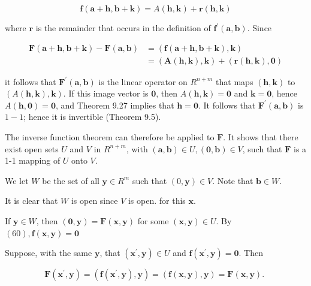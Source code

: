 \documentclass[10pt]{article}
\begin{document}
$$
\mathbf{f}(\mathbf{a}+\mathbf{h}, \mathbf{b}+\mathbf{k})=A(\mathbf{h}, \mathbf{k})+\mathbf{r}(\mathbf{h}, \mathbf{k})
$$

where $\mathbf{r}$ is the remainder that occurs in the definition of $\mathbf{f}^{\prime}(\mathbf{a}, \mathbf{b})$. Since

$$
\begin{aligned}
\mathbf{F}(\mathbf{a}+\mathbf{h}, \mathbf{b}+\mathbf{k})-\mathbf{F}(\mathbf{a}, \mathbf{b}) & =(\mathbf{f}(\mathbf{a}+\mathbf{h}, \mathbf{b}+\mathbf{k}), \mathbf{k}) \\
& =(\mathbf{A}(\mathbf{h}, \mathbf{k}), \mathbf{k})+(\mathbf{r}(\mathbf{h}, \mathbf{k}), \mathbf{0})
\end{aligned}
$$

it follows that $\mathbf{F}^{\prime}(\mathbf{a}, \mathbf{b})$ is the linear operator on $R^{n+m}$ that maps $(\mathbf{h}, \mathbf{k})$ to $(A(\mathbf{h}, \mathbf{k}), \mathbf{k})$. If this image vector is $\mathbf{0}$, then $A(\mathbf{h}, \mathbf{k})=\mathbf{0}$ and $\mathbf{k}=\mathbf{0}$, hence $A(\mathbf{h}, \mathbf{0})=\mathbf{0}$, and Theorem 9.27 implies that $\mathbf{h}=\mathbf{0}$. It follows that $\mathbf{F}^{\prime}(\mathbf{a}, \mathbf{b})$ is $1-1$; hence it is invertible (Theorem 9.5).

The inverse function theorem can therefore be applied to $\mathbf{F}$. It shows that there exist open sets $U$ and $V$ in $R^{n+m}$, with $(\mathbf{a}, \mathbf{b}) \in U,(\mathbf{0}, \mathbf{b}) \in V$, such that $\mathbf{F}$ is a 1-1 mapping of $U$ onto $V$.

We let $W$ be the set of all $\mathbf{y} \in R^{m}$ such that $(0, \mathbf{y}) \in V$. Note that $\mathbf{b} \in W$.

It is clear that $W$ is open since $V$ is open. for this $\mathbf{x}$.

If $\mathbf{y} \in W$, then $(\mathbf{0}, \mathbf{y})=\mathbf{F}(\mathbf{x}, \mathbf{y})$ for some $(\mathbf{x}, \mathbf{y}) \in U$. By $(60), \mathbf{f}(\mathbf{x}, \mathbf{y})=\mathbf{0}$

Suppose, with the same $\mathbf{y}$, that $\left(\mathbf{x}^{\prime}, \mathbf{y}\right) \in U$ and $\mathbf{f}\left(\mathbf{x}^{\prime}, \mathbf{y}\right)=\mathbf{0}$. Then

$$
\mathbf{F}\left(\mathbf{x}^{\prime}, \mathbf{y}\right)=\left(\mathbf{f}\left(\mathbf{x}^{\prime}, \mathbf{y}\right), \mathbf{y}\right)=(\mathbf{f}(\mathbf{x}, \mathbf{y}), \mathbf{y})=\mathbf{F}(\mathbf{x}, \mathbf{y}) \text {. }
$$
\end{document}
